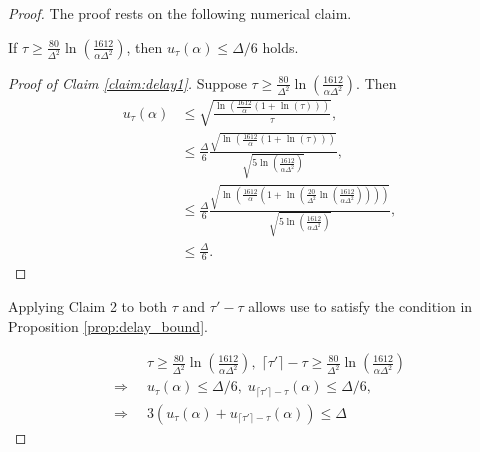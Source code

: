 \begin{proof}


The proof rests on the following numerical claim.

\begin{claim}
If $\tau \geq \frac{80}{\Delta^2}\ln \left( \frac{1612}{\alpha \Delta^2}\right)$, then $u_\tau(\alpha) \leq \Delta/6 $ holds.
\label{claim:delay1}
\end{claim}
{\color{black}
\begin{proof}[Proof of Claim \ref{claim:delay1}]
Suppose $\tau \geq \frac{80}{\Delta^2}\ln \left( \frac{1612}{\alpha \Delta^2}\right)$. Then
\begin{align*} 
    u_{\tau}(\alpha) &\leq \sqrt{\frac{\ln \left( \frac{1612}{\alpha}(1+\ln(\tau)) \right)}{\tau}}, \\
    &\leq \frac{\Delta}{6}  \frac{\sqrt{{\ln \left( \frac{1612}{\alpha}(1+\ln(\tau)) \right)}}}{\sqrt{5\ln \left( \frac{1612}{\alpha \Delta^2} \right)}}, \\
    &\leq \frac{\Delta}{6} \frac{\sqrt{\ln \left( \frac{1612}{\alpha}\left(1+\ln\left(\frac{20}{\Delta^2}\ln \left( \frac{1612}{\alpha \Delta^2} \right)\right)\right) \right)}}{{\sqrt{5\ln \left( \frac{1612}{\alpha \Delta^2} \right)}}}, \\
    &\leq \frac{\Delta}{6}.
\end{align*}
\end{proof}

Applying Claim 2 to both $\tau$ and $\tau' - \tau$ allows use to satisfy the condition in Proposition \ref{prop:delay_bound}.

\begin{align*}
    & \tau \geq  \frac{80}{\Delta^2}\ln \left( \frac{1612}{\alpha \Delta^2}\right), \; \lceil \tau' \rceil - \tau \geq  \frac{80}{\Delta^2}\ln \left( \frac{1612}{\alpha \Delta^2}\right) \\
\Longrightarrow \;\; & u_{{\tau}}(\alpha) \leq \Delta/6, \; u_{{\lceil \tau' \rceil-\tau}}(\alpha) \leq \Delta/6, \\
\Longrightarrow \;\; & 3(u_{{\tau}}(\alpha)+ u_{{\lceil \tau' \rceil-\tau}}(\alpha)) \leq \Delta
\end{align*}

}
\end{proof}



